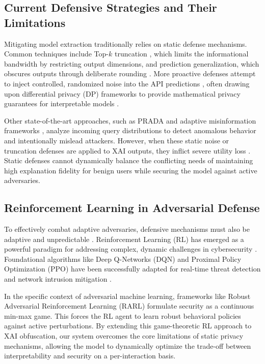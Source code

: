 \documentclass[conference]{IEEEtran}
\begin{document}
\subsection{Current Defensive Strategies and Their Limitations}
Mitigating model extraction traditionally relies on static defense mechanisms. Common techniques include Top-$k$ truncation \cite{b2}, which limits the informational bandwidth by restricting output dimensions, and prediction generalization, which obscures outputs through deliberate rounding \cite{b3}. More proactive defenses attempt to inject controlled, randomized noise into the API predictions \cite{b4, b20}, often drawing upon differential privacy (DP) frameworks \cite{b21} to provide mathematical privacy guarantees for interpretable models \cite{b22}.

Other state-of-the-art approaches, such as PRADA \cite{b17} and adaptive misinformation frameworks \cite{b18, b19}, analyze incoming query distributions to detect anomalous behavior and intentionally mislead attackers. However, when these static noise or truncation defenses are applied to XAI outputs, they inflict severe utility loss \cite{b4}. Static defenses cannot dynamically balance the conflicting needs of maintaining high explanation fidelity for benign users while securing the model against active adversaries.

\subsection{Reinforcement Learning in Adversarial Defense}
To effectively combat adaptive adversaries, defensive mechanisms must also be adaptive and unpredictable \cite{b28}. Reinforcement Learning (RL) has emerged as a powerful paradigm for addressing complex, dynamic challenges in cybersecurity \cite{b25}. Foundational algorithms like Deep Q-Networks (DQN) \cite{b24} and Proximal Policy Optimization (PPO) \cite{b23} have been successfully adapted for real-time threat detection and network intrusion mitigation \cite{b26}.

In the specific context of adversarial machine learning, frameworks like Robust Adversarial Reinforcement Learning (RARL) \cite{b27} formulate security as a continuous min-max game. This forces the RL agent to learn robust behavioral policies against active perturbations. By extending this game-theoretic RL approach to XAI obfuscation, our system overcomes the core limitations of static privacy mechanisms, allowing the model to dynamically optimize the trade-off between interpretability and security on a per-interaction basis.
\end{document}
